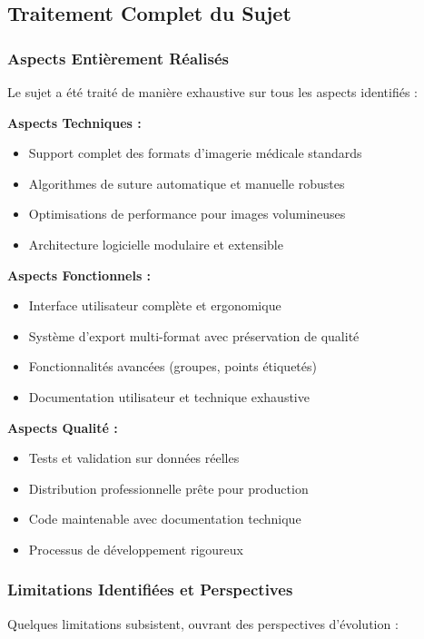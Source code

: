 \documentclass[12pt,a4paper]{article}
\begin{document}
\subsection{Traitement Complet du Sujet}

\subsubsection{Aspects Entièrement Réalisés}

Le sujet a été traité de manière exhaustive sur tous les aspects identifiés :

\textbf{Aspects Techniques :}
\begin{itemize}
\item Support complet des formats d'imagerie médicale standards
\item Algorithmes de suture automatique et manuelle robustes
\item Optimisations de performance pour images volumineuses
\item Architecture logicielle modulaire et extensible
\end{itemize}

\textbf{Aspects Fonctionnels :}
\begin{itemize}
\item Interface utilisateur complète et ergonomique
\item Système d'export multi-format avec préservation de qualité
\item Fonctionnalités avancées (groupes, points étiquetés)
\item Documentation utilisateur et technique exhaustive
\end{itemize}

\textbf{Aspects Qualité :}
\begin{itemize}
\item Tests et validation sur données réelles
\item Distribution professionnelle prête pour production
\item Code maintenable avec documentation technique
\item Processus de développement rigoureux
\end{itemize}

\subsubsection{Limitations Identifiées et Perspectives}

Quelques limitations subsistent, ouvrant des perspectives d'évolution :
\end{document}
